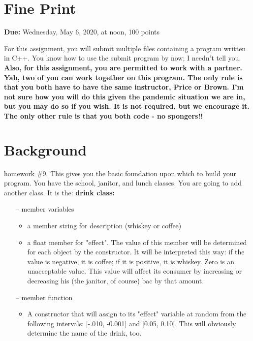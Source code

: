 \documentclass[
    subject = {{Comp Sci}},
    course = {{1570}},
    section = {{101}},
    assignment = {{Assignment 10 \\ Final Project}},
    name = {{Student One ; Student Two}},
    email = {{stosid@mst.edu ; sttsid@mst.edu}}
]{eey-homework}
\begin{document}
\section{Fine Print}
\textbf{Due:} Wednesday, May 6, 2020, at noon, 100 points \hfill\break

For this assignment, you will submit multiple files containing a program written in C++.
You know how to use the submit program by now; I needn't tell you.
\textbf{
    Also, for this assignment, you are permitted to work with a partner.
    Yah, two of you can work together on this program.
    The only rule is that you both have to have the same instructor, Price or Brown.
    I'm not sure how you will do this given the pandemic situation we are in, but you may do so if you wish.
    It is not required, but we encourage it.
    The only other rule is that you both code - no spongers!!
}

\section{Background}
homework \#9.
This gives you the basic foundation upon which to build your program.
You have the school, janitor, and lunch classes.
You are going to add another class. It is the: \textbf{drink class:}
\begin{itemize}
    \item[--]{member variables}
    \begin{itemize}
        \item{a member string for description (whiskey or coffee)}
        \item{a float member for "effect". The value of this member will be determined for each object by the constructor. It will be interpreted this way: if the value is negative, it is coffee; if it is positive, it is whiskey. Zero is an unacceptable value. This value will affect its consumer by increasing or decreasing his (the janitor, of course) bac by that amount.}
    \end{itemize}
    \item[--]{member function}
    \begin{itemize}
        \item{A constructor that will assign to its "effect" variable at random from the following intervals: [-.010, -0.001] and [0.05, 0.10].  This will obviously determine the name of the drink, too.}
    \end{itemize}
\end{itemize}
\end{document}

